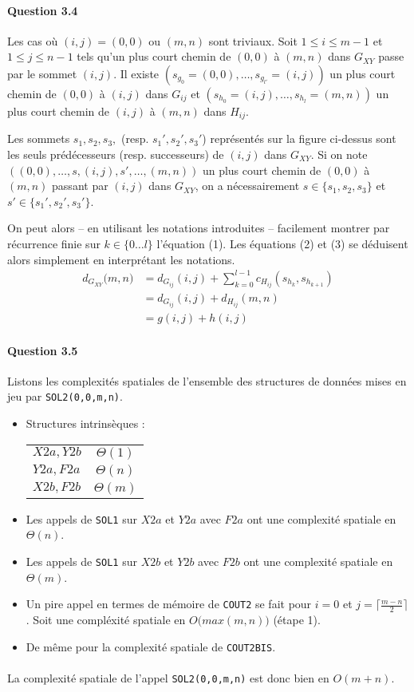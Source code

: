\paragraph{Question 3.4}
Les cas o\`u $(i,j)=(0,0)$ ou $(m,n)$ sont triviaux. Soit
$1\leq i\leq m-1$ et $1\leq j\leq n-1$ tels qu'un plus court
chemin de $(0,0)$ \`a $(m,n)$ dans $G_{XY}$ passe par le sommet
$(i,j)$. Il existe $(s_{g_0}=(0,0),\ldots,s_{g_{l'}}=(i,j))$ un plus
court chemin de $(0,0)$ \`a $(i,j)$ dans $G_{ij}$ et
$(s_{h_0}=(i,j),\ldots,s_{h_l}=(m,n))$ un plus court chemin de $(i,j)$
\`a $(m,n)$ dans $H_{ij}$.
 
\pagebreak

Les sommets $s_1,s_2,s_3,$ (resp. $s_1',s_2',s_3'$) repr\'esent\'es
sur la figure ci-dessus sont les seuls pr\'ed\'ecesseurs
(resp. successeurs) de $(i,j)$ dans $G_{XY}$. Si on note
$((0,0),\ldots,s,(i,j),s',\ldots,(m,n))$ un plus court chemin de
$(0,0)$ \`a $(m,n)$ passant par $(i,j)$ dans $G_{XY}$, on a
n\'ecessairement $s\in\{s_1,s_2,s_3\}$ et $s'\in\{s_1',s_2',s_3'\}$.

On peut alors -- en utilisant les notations introduites -- facilement
montrer par r\'ecurrence finie sur $k\in\{0\ldots l\}$ l'\'equation
(1). Les \'equations (2) et (3) se d\'eduisent alors simplement en
interpr\'etant les notations.
\begin{align}
  d_{G_{XY}}\big(m,n\big)
  &=d_{G_{ij}}(i,j)+\sum_{k=0}^{l-1}c_{H_{ij}}(s_{h_k},s_{h_{k+1}})\\
  &=d_{G_{ij}}(i,j)+d_{H_{ij}}(m,n)\\
  &=g(i,j)+h(i,j)
\end{align}

\paragraph{Question 3.5}
Listons les complexit\'es spatiales de l'ensemble des structures de
donn\'ees mises en jeu par \verb'SOL2(0,0,m,n)'.
\begin{itemize}
\item Structures intrins\`eques :
\begin{table*}[h]
  \centering
\begin{tabular}{l|c}
  $X2a,Y2b$&$\Theta(1)$\\
  $Y2a,F2a$&$\Theta(n)$\\
  $X2b,F2b$&$\Theta(m)$\\
\end{tabular}
\end{table*}
\item Les appels de \verb'SOL1' sur $X2a$ et $Y2a$ avec $F2a$ ont une
  complexit\'e spatiale en $\Theta(n)$.
\item Les appels de \verb'SOL1' sur $X2b$ et $Y2b$ avec $F2b$ ont une
  complexit\'e spatiale en $\Theta(m)$.
\item Un pire appel en termes de m\'emoire de \verb'COUT2' se fait
  pour $i=0$ et $j=\lceil\frac{m-n}{2}\rceil$. Soit une compl\'exit\'e
  spatiale en $O\big(max(m,n)\big)$ (\'etape 1).
\item De m\^eme pour la complexit\'e spatiale de \verb'COUT2BIS'.
\end{itemize}
\paragraph{}
La complexit\'e spatiale de l'appel \verb'SOL2(0,0,m,n)' est donc bien
en $O(m+n)$.
